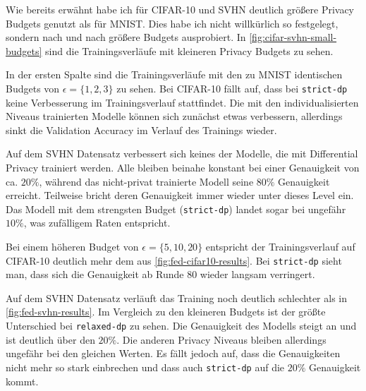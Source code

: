 Wie bereits erwähnt habe ich für CIFAR-10 und SVHN deutlich größere Privacy Budgets genutzt als für MNIST. Dies habe ich nicht willkürlich so festgelegt, sondern nach und nach größere Budgets ausprobiert. In \autoref{fig:cifar-svhn-small-budgets} sind die Trainingsverläufe mit kleineren Privacy Budgets zu sehen.

In der ersten Spalte sind die Trainingsverläufe mit den zu MNIST identischen Budgets von $\epsilon = \{1,2,3\}$ zu sehen. Bei CIFAR-10 fällt auf, dass bei \texttt{strict-dp} keine Verbesserung im Trainingsverlauf stattfindet. Die mit den individualisierten Niveaus trainierten Modelle können sich zunächst etwas verbessern, allerdings sinkt die Validation Accuracy im Verlauf des Trainings wieder.

Auf dem SVHN Datensatz verbessert sich keines der Modelle, die mit Differential Privacy trainiert werden. Alle bleiben beinahe konstant bei einer Genauigkeit von ca. $20\%$, während das nicht-privat trainierte Modell seine $80\%$ Genauigkeit erreicht. Teilweise bricht deren Genauigkeit immer wieder unter dieses Level ein. Das Modell mit dem strengsten Budget (\texttt{strict-dp}) landet sogar bei ungefähr $10\%$, was zufälligem Raten entspricht.

Bei einem höheren Budget von $\epsilon = \{5, 10, 20\}$ entspricht der Trainingsverlauf auf CIFAR-10 deutlich mehr dem aus \autoref{fig:fed-cifar10-results}. Bei \texttt{strict-dp} sieht man, dass sich die Genauigkeit ab Runde $80$ wieder langsam verringert.

Auf dem SVHN Datensatz verläuft das Training noch deutlich schlechter als in \autoref{fig:fed-svhn-results}. Im Vergleich zu den kleineren Budgets ist der größte Unterschied bei \texttt{relaxed-dp} zu sehen. Die Genauigkeit des Modells steigt an und ist deutlich über den $20\%$. Die anderen Privacy Niveaus bleiben allerdings ungefähr bei den gleichen Werten. Es fällt jedoch auf, dass die Genauigkeiten nicht mehr so stark einbrechen und dass auch \texttt{strict-dp} auf die $20\%$ Genauigkeit kommt.

